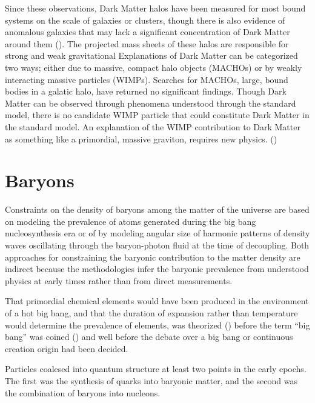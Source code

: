 \documentclass{paper}
\begin{document}
  Since these observations, Dark Matter halos have been measured for most 
  bound systems on the scale of galaxies or clusters, though there is also
  evidence of anomalous galaxies that may lack a significant concentration
  of Dark Matter around them (\cite{10.1093/mnras/stab3491}). The projected
  mass sheets of these halos are responsible for strong and weak gravitational 
  Explanations of Dark Matter can be categorized two ways; either due to 
  massive, compact halo objects (MACHOs) or by weakly interacting massive 
  particles (WIMPs). Searches for MACHOs, large, bound bodies in a galatic 
  halo, have returned no significant findings. Though Dark Matter can be 
  observed through phenomena understood through the standard model, there is 
  no candidate WIMP particle that could constitute Dark Matter in the standard 
  model. An explanation of the WIMP contribution to Dark Matter as something 
  like a primordial, massive graviton, requires new physics.
  (\cite{PhysRevLett.128.081806})

\section{Baryons}
  Constraints on the density of baryons among the matter of the universe are
  based on modeling the prevalence of atoms generated during the big bang 
  nucleosynthesis era or of by modeling angular size of harmonic patterns of
  density waves oscillating through the baryon-photon fluid at the time of
  decoupling. Both approaches for constraining the baryonic contribution
  to the matter density are indirect because the methodologies infer the 
  baryonic prevalence from understood physics at early times rather than
  from direct measurements.

  That primordial chemical elements would have been produced in the 
  environment of a hot big bang, and that the duration of expansion rather 
  than temperature would determine the prevalence of elements, was theorized 
  (\cite{PhysRev.73.803}) before the term ``big bang'' was coined 
  (\cite{Hoyle1949}) and well before the debate over a big bang or continuous 
  creation origin had been decided.

  Particles coalesed into quantum structure at least two points in the early 
  epochs. The first was the synthesis of quarks into baryonic matter, and the
  second was the combination of baryons into nucleons.
\end{document}
